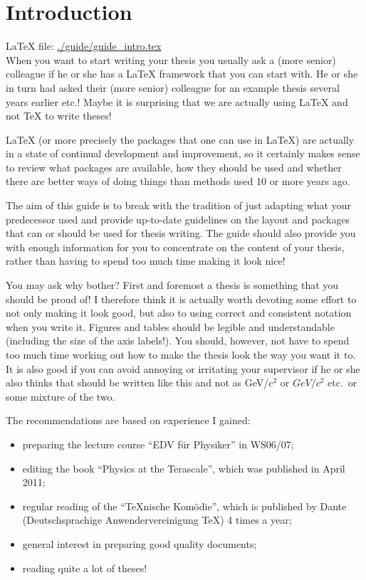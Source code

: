 \chapter{Introduction}
\label{sec:intro}

\LaTeX{} file: \url{./guide/guide_intro.tex}\\[1ex]
\noindent
When you want to start writing your thesis you usually ask a (more
senior) colleague if he or she has a \gls{LaTeX} framework that you can
start with. He or she in turn had asked their (more senior) colleague
for an example thesis several years earlier etc.! Maybe it is
surprising that we are actually using \LaTeX{} and not \TeX{} to write
theses!

\LaTeX{} (or more precisely the packages that one
can use in \LaTeX) are actually in a state of continual development
and improvement, so it certainly makes sense to review what packages
are available, how they should be used and whether there are better
ways of doing things than methods used 10 or more years ago.

The aim of this guide is to break with the tradition of just adapting
what your predecessor used and provide up-to-date guidelines on the
layout and packages that can or should be used for thesis writing. The
guide should also provide you with enough information for you to
concentrate on the content of your thesis, rather than having to spend
too much time making it look nice!

You may ask why bother? First and foremost a thesis is something that
you should be proud of! I therefore think it is actually worth
devoting some effort to not only making it look good, but also to
using correct and consistent notation when you write it. Figures and
tables should be legible and understandable (including the size of the
axis labels!). You should, however, not have to spend too much time
working out how to make the thesis look the way you want it to. It is
also good if you can avoid annoying or irritating your supervisor if he
or she also thinks that \si{\GeVovercsq} should be written like this and
not as GeV/c$^{2}$ or $GeV/c^{2}$ etc.\ or some mixture of the two.

The recommendations are based on experience I gained:
\begin{itemize}
\item  preparing the
lecture course \foreignquote{ngerman}{EDV für Physiker} in WS06/07;
\item editing the book \enquote{Physics at the Terascale}, which was
  published in April 2011;
\item regular reading of the \foreignquote{ngerman}{TeXnische Komödie},
  which is published by \foreignlanguage{ngerman}{Dante
    (Deutschsprachige Anwendervereinigung \TeX)} 4 times a year;
\item general interest in preparing good quality documents;
\item reading quite a lot of theses!
\end{itemize}

